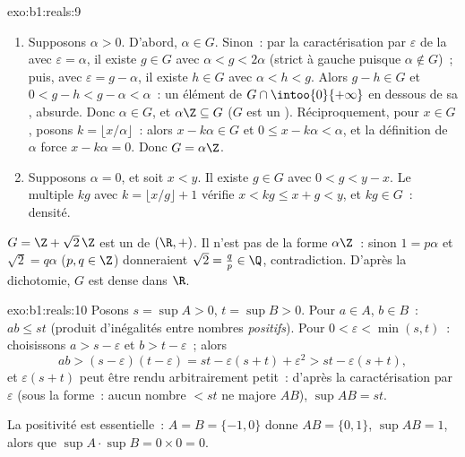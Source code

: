\begin{solution}{exo:b1:reals:9}
\begin{enumerate}
  \item Supposons $\alpha > 0$. D'abord, $\alpha \in G$. Sinon~: par
        la caractérisation par $\varepsilon$ de la 
        avec $\varepsilon = \alpha$, il existe $g \in G$ avec $\alpha
        < g < 2\alpha$ (strict à gauche puisque $\alpha \notin G$)~;
        puis, avec $\varepsilon = g - \alpha$, il existe $h \in G$
        avec $\alpha < h < g$. Alors $g - h \in G$ et $0 < g - h < g -
        \alpha < \alpha$~: un élément de $G \cap \intoo{0}{+\infty}$
        en dessous de sa , absurde. Donc $\alpha \in
        G$, et $\alpha\Z \subseteq G$ ($G$ est un ).
        Réciproquement, pour $x \in G$, posons $k = \lfloor x/\alpha
        \rfloor$~: alors $x - k\alpha \in G$ et $0 \leq x - k\alpha <
        \alpha$, et la définition de $\alpha$ force $x - k\alpha = 0$.
        Donc $G = \alpha\Z$.
  \item Supposons $\alpha = 0$, et soit $x < y$. Il existe $g \in G$
        avec $0 < g < y - x$. Le multiple $kg$ avec $k = \lfloor x/g
        \rfloor + 1$ vérifie $x < kg \leq x + g < y$, et $kg \in G$~:
        densité.
\end{enumerate}
$G = \Z + \sqrt 2\,\Z$ est un  de $(\R, +)$. Il n'est pas
de la forme $\alpha\Z$~: sinon $1 = p\alpha$ et $\sqrt 2 = q\alpha$
($p, q \in \Z$) donneraient $\sqrt 2 = \frac qp \in \Q$,
contradiction. D'après la dichotomie, $G$ est dense dans $\R$.
\end{solution}

\begin{solution}{exo:b1:reals:10}
Posons $s = \sup A > 0$, $t = \sup B > 0$. Pour $a \in A$, $b \in B$~:
$ab \leq st$ (produit d'inégalités entre nombres \emph{positifs}).
Pour $0 < \varepsilon < \min(s, t)$~: choisissons $a > s - \varepsilon$
et $b > t - \varepsilon$~; alors
\[
ab > (s - \varepsilon)(t - \varepsilon)
= st - \varepsilon(s + t) + \varepsilon^2
> st - \varepsilon (s + t),
\]
et $\varepsilon(s+t)$ peut être rendu arbitrairement petit~: d'après
la caractérisation par $\varepsilon$ (sous la forme~: aucun nombre $<
st$ ne majore $AB$), $\sup AB = st$.

La positivité est essentielle~: $A = B = \{-1, 0\}$ donne $AB = \{0,
1\}$, $\sup AB = 1$, alors que $\sup A \cdot \sup B = 0 \times 0 = 0$.
\end{solution}

